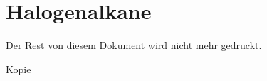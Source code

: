 \section{Halogenalkane}
\label{app:sec:Halogenalkane}
Der Rest von diesem Dokument wird nicht mehr gedruckt.

Kopie

\newpage
